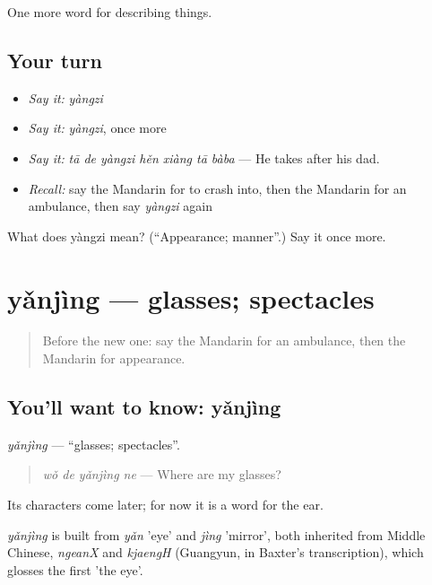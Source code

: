 \begin{grammarlens}[title={What you've built}]
One more word for describing things.
\end{grammarlens}

\subsection*{Your turn}
\begin{itemize}
\raggedright
  \item \emph{Say it:} \emph{yàngzi}
  \item \emph{Say it:} \emph{yàngzi}, once more
  \item \emph{Say it:} \emph{tā de yàngzi hěn xiàng tā bàba} — He takes after his dad.
  \item \emph{Recall:} say the Mandarin for to crash into, then the Mandarin for an ambulance, then say \emph{yàngzi} again
\end{itemize}

\begin{tcolorbox}[breakable,colback=teal!4,colframe=teal!35!black,title={Before you move on}]
What does yàngzi mean? (\textquotedblleft{}Appearance; manner\textquotedblright{}.) Say it once more.
\end{tcolorbox}
\section[yǎnjìng]{yǎnjìng — glasses; spectacles}

\label{lesson:ZH-C233-yanjing}



\begin{quote}
Before the new one: say the Mandarin for an ambulance, then the Mandarin for appearance.
\end{quote}

\subsection*{You'll want to know: yǎnjìng}
\emph{yǎnjìng} — \textquotedblleft{}glasses; spectacles\textquotedblright{}.

\begin{quote}
\emph{wǒ de yǎnjìng ne} — Where are my glasses?
\end{quote}

Its characters come later; for now it is a word for the ear.

\begin{cousinweb}
\emph{yǎnjìng} is built from \emph{yǎn} 'eye' and \emph{jìng} 'mirror', both inherited from Middle Chinese, \emph{ngeanX} and \emph{kjaengH} (Guangyun, in Baxter's transcription), which glosses the first 'the eye'.
\end{cousinweb}

